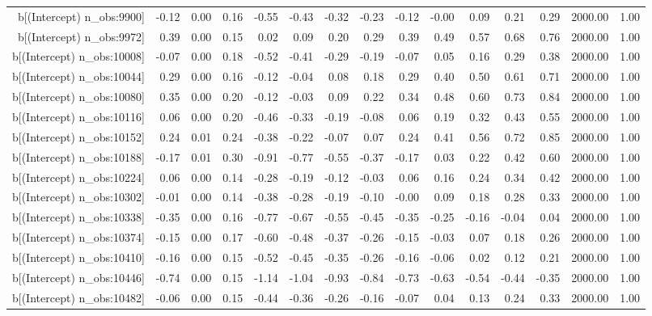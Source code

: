\begin{table}[ht]
\begin{tabular}{rrrrrrrrrrrrrrr}
  b[(Intercept) n\_obs:9900] & -0.12 & 0.00 & 0.16 & -0.55 & -0.43 & -0.32 & -0.23 & -0.12 & -0.00 & 0.09 & 0.21 & 0.29 & 2000.00 & 1.00 \\ 
  b[(Intercept) n\_obs:9972] & 0.39 & 0.00 & 0.15 & 0.02 & 0.09 & 0.20 & 0.29 & 0.39 & 0.49 & 0.57 & 0.68 & 0.76 & 2000.00 & 1.00 \\ 
  b[(Intercept) n\_obs:10008] & -0.07 & 0.00 & 0.18 & -0.52 & -0.41 & -0.29 & -0.19 & -0.07 & 0.05 & 0.16 & 0.29 & 0.38 & 2000.00 & 1.00 \\ 
  b[(Intercept) n\_obs:10044] & 0.29 & 0.00 & 0.16 & -0.12 & -0.04 & 0.08 & 0.18 & 0.29 & 0.40 & 0.50 & 0.61 & 0.71 & 2000.00 & 1.00 \\ 
  b[(Intercept) n\_obs:10080] & 0.35 & 0.00 & 0.20 & -0.12 & -0.03 & 0.09 & 0.22 & 0.34 & 0.48 & 0.60 & 0.73 & 0.84 & 2000.00 & 1.00 \\ 
  b[(Intercept) n\_obs:10116] & 0.06 & 0.00 & 0.20 & -0.46 & -0.33 & -0.19 & -0.08 & 0.06 & 0.19 & 0.32 & 0.43 & 0.55 & 2000.00 & 1.00 \\ 
  b[(Intercept) n\_obs:10152] & 0.24 & 0.01 & 0.24 & -0.38 & -0.22 & -0.07 & 0.07 & 0.24 & 0.41 & 0.56 & 0.72 & 0.85 & 2000.00 & 1.00 \\ 
  b[(Intercept) n\_obs:10188] & -0.17 & 0.01 & 0.30 & -0.91 & -0.77 & -0.55 & -0.37 & -0.17 & 0.03 & 0.22 & 0.42 & 0.60 & 2000.00 & 1.00 \\ 
  b[(Intercept) n\_obs:10224] & 0.06 & 0.00 & 0.14 & -0.28 & -0.19 & -0.12 & -0.03 & 0.06 & 0.16 & 0.24 & 0.34 & 0.42 & 2000.00 & 1.00 \\ 
  b[(Intercept) n\_obs:10302] & -0.01 & 0.00 & 0.14 & -0.38 & -0.28 & -0.19 & -0.10 & -0.00 & 0.09 & 0.18 & 0.28 & 0.33 & 2000.00 & 1.00 \\ 
  b[(Intercept) n\_obs:10338] & -0.35 & 0.00 & 0.16 & -0.77 & -0.67 & -0.55 & -0.45 & -0.35 & -0.25 & -0.16 & -0.04 & 0.04 & 2000.00 & 1.00 \\ 
  b[(Intercept) n\_obs:10374] & -0.15 & 0.00 & 0.17 & -0.60 & -0.48 & -0.37 & -0.26 & -0.15 & -0.03 & 0.07 & 0.18 & 0.26 & 2000.00 & 1.00 \\ 
  b[(Intercept) n\_obs:10410] & -0.16 & 0.00 & 0.15 & -0.52 & -0.45 & -0.35 & -0.26 & -0.16 & -0.06 & 0.02 & 0.12 & 0.21 & 2000.00 & 1.00 \\ 
  b[(Intercept) n\_obs:10446] & -0.74 & 0.00 & 0.15 & -1.14 & -1.04 & -0.93 & -0.84 & -0.73 & -0.63 & -0.54 & -0.44 & -0.35 & 2000.00 & 1.00 \\ 
  b[(Intercept) n\_obs:10482] & -0.06 & 0.00 & 0.15 & -0.44 & -0.36 & -0.26 & -0.16 & -0.07 & 0.04 & 0.13 & 0.24 & 0.33 & 2000.00 & 1.00 \\ 

\end{tabular}
\end{table}
